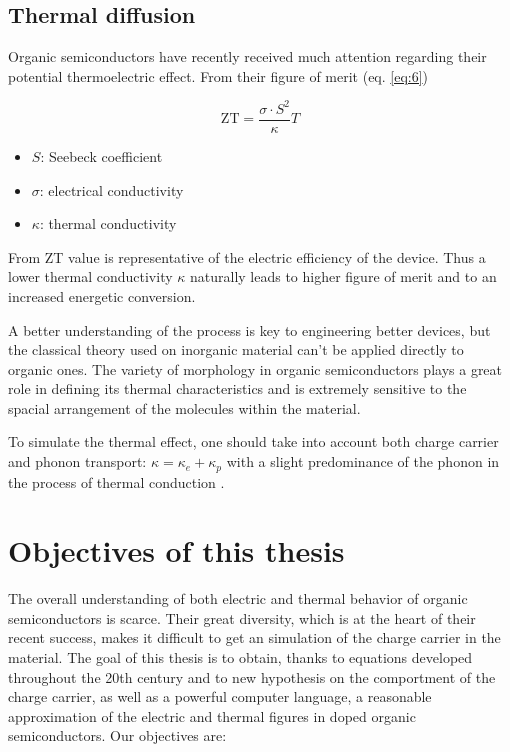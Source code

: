 \subsection{Thermal diffusion}

Organic semiconductors have recently received much attention regarding their potential thermoelectric effect. From their figure of merit (eq. \ref{eq:6})

\begin{equation}
    \mathrm{ZT}=\frac{\sigma \cdot S^{2}}{\kappa} T
    \label{eq:6}
\end{equation}

\begin{itemize}
    \item $S$: Seebeck coefficient
    \item $\sigma$: electrical conductivity
    \item $\kappa$: thermal conductivity
\end{itemize}

From ZT value is representative of the electric efficiency of the device. Thus a lower thermal conductivity $\kappa$ naturally leads to higher figure of merit and to an increased energetic conversion.

A better understanding of the process is key to engineering better devices, but the classical theory used on inorganic material \cite{einstein_model_thermic} can't be applied directly to organic ones. The variety of morphology in organic semiconductors plays a great role in defining its thermal characteristics and is extremely sensitive to the spacial arrangement of the molecules within the material.

To simulate the thermal effect, one should take into account both charge carrier and phonon transport: $\kappa = \kappa_e + \kappa_p$ with a slight predominance of the phonon in the process of thermal conduction \cite{universal_einstein}.

\section{Objectives of this thesis}

The overall understanding of both electric and thermal behavior of organic semiconductors is scarce. Their great diversity, which is at the heart of their recent success, makes it difficult to get an simulation of the charge carrier in the material. The goal of this thesis is to obtain, thanks to equations developed throughout the 20th century and to new hypothesis on the comportment of the charge carrier, as well as a powerful computer language, a reasonable approximation of the electric and thermal figures in doped organic semiconductors. Our objectives are:

